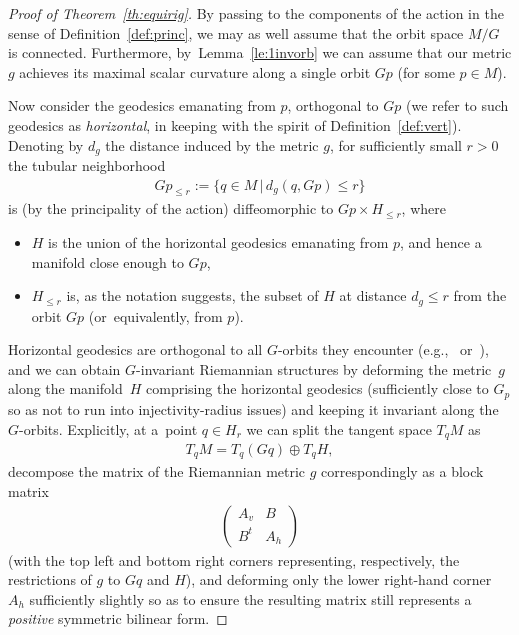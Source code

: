 \documentclass[10pt,a4paper]{amsart}
\numberwithin{equation}{section}
\begin{document}
\begin{proof}[Proof of Theorem~\ref{th:equirig}]
 By passing to the components of the action in the sense of Definition~\ref{def:princ}, we may as well assume that the orbit space $M/G$ is connected. Furthermore, by~Lemma~\ref{le:1invorb} we can assume that our metric $g$ achieves its maximal scalar curvature along a single orbit $Gp$ (for some $p\in M$).

 Now consider the geodesics emanating from $p$, orthogonal to $Gp$ (we refer to such geodesics as {\it horizontal}, in keeping with the spirit of Definition~\ref{def:vert}). Denoting by $d_g$ the distance induced by the metric $g$, for sufficiently small $r>0$ the tubular neighborhood
 \begin{gather*}
 Gp_{\le r}:=\{q\in M\,|\, d_g(q,Gp)\le r\}
 \end{gather*}
 is (by the principality of the action) diffeomorphic to $Gp\times H_{\le r}$, where
 \begin{itemize}\itemsep=0pt
 \item $H$ is the union of the horizontal geodesics emanating from $p$, and hence a manifold close enough to $Gp$,
 \item $H_{\le r}$ is, as the notation suggests, the subset of $H$ at distance $d_g\le r$ from the orbit $Gp$ (or~equivalently, from $p$).
 \end{itemize}
 Horizontal geodesics are orthogonal to all $G$-orbits they encounter (e.g.,~\cite[Lemma 9.44]{bes} or~\cite[Section~1.1]{haef-riem}), and we can obtain $G$-invariant Riemannian structures by deforming the metric~$g$ along the manifold~$H$ comprising the horizontal geodesics (sufficiently close to $G_p$ so as not to run into injectivity-radius issues) and keeping it invariant along the $G$-orbits. Explicitly, at a~point $q\in H_r$ we can split the tangent space $T_qM$ as
 \begin{gather*}
 T_qM = T_q(Gq)\oplus T_qH,
 \end{gather*}
 decompose the matrix of the Riemannian metric $g$ correspondingly as a block matrix
 \begin{gather*}
 \begin{pmatrix}
 A_v&B\\
 B^t&A_h
 \end{pmatrix}
 \end{gather*}
 (with the top left and bottom right corners representing, respectively, the restrictions of $g$ to $Gq$ and $H$), and deforming only the lower right-hand corner $A_h$ sufficiently slightly so as to ensure the resulting matrix still represents a {\it positive} symmetric bilinear form.


\end{proof}
\end{document}
